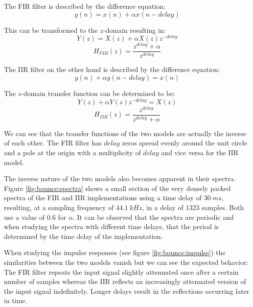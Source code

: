 \documentclass[journal]{IEEEtran}
\begin{document}
The FIR filter is described by the difference equation:
\begin{equation}
    y(n) = x(n) + \alpha x(n-delay)
\end{equation}

This can be transformed to the $z$-domain resulting in:
 \begin{equation}
     Y(z) = X(z) + \alpha X(z) z^{-delay}
 \end{equation}
 \begin{equation}
     H_{FIR}(z) = \frac{z^{delay} + \alpha}{z^{delay}}
\end{equation}

The IIR filter on the other hand is described by the difference equation:
\begin{equation}
    y(n) + \alpha y(n-delay) = x(n)
\end{equation}

The $z$-domain transfer function can be determined to be:
\begin{equation}
    Y(z) + \alpha Y(z) z^{-delay} = X(z)
\end{equation}
\begin{equation}
    H_{IIR}(z) = \frac{z^{delay}}{z^{delay} + \alpha}
\end{equation}

We can see that the transfer functions of the two models are actually the inverse of each other. The FIR filter has $delay$ zeros spread evenly around the unit circle and a pole at the origin with a multiplicity of $delay$ and vice versa for the IIR model.

The inverse nature of the two models also becomes apparent in their spectra. Figure \ref{fig:bounce:spectra} shows a small section of the very densely packed spectra of the FIR and IIR implementations using a time delay of $\SI{30}{ms}$, resulting, at a sampling frequency of $\SI{44.1}{kHz}$, in a delay of 1323 samples. Both use a value of 0.6 for $\alpha$. It can be observed that the spectra are periodic and when studying the spectra with different time delays, that the period is determined by the time delay of the implementation.

When studying the impulse responses (see figure \ref{fig:bounce:impulse}) the similarities between the two models vanish but we can see the expected behavior: The FIR filter repeats the input signal slightly attenuated once after a certain number of samples whereas the IIR reflects an increasingly attenuated version of the input signal indefinitely. Longer delays result in the reflections occurring later in time.
\end{document}
